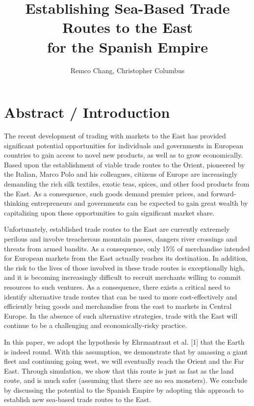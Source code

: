 \documentclass{proc}
\begin{document}
\title{Establishing Sea-Based Trade Routes to the East\\for the Spanish Empire}

\author{Remco Chang, Christopher Columbus}

\maketitle

\section{Abstract / Introduction}

The recent development of trading with markets to the East has provided significant potential opportunities for individuals and governments in European countries to gain access to novel new products, as well as to grow economically.
Based upon the establishment of viable trade routes to the Orient, pioneered by the Italian, Marco Polo and his colleagues, citizens of Europe are increasingly demanding the rich silk textiles, exotic teas, spices, and other food products from the East.
As a consequence, such goods demand premier prices, and forward-thinking entrepreneurs and governments can be expected to gain great wealth by capitalizing upon these opportunities to gain significant market share.

Unfortunately, established trade routes to the East are currently extremely perilous and involve treacherous mountain passes, dangers river crossings and threats from armed bandits.
As a consequence, only 15\% of merchandise intended for European markets from the East actually reaches its destination.
In addition, the risk to the lives of those involved in these trade routes is exceptionally high, and it is becoming increasingly difficult to recruit merchants willing to commit resources to such ventures.
As a consequence, there exists a critical need to identify alternative trade routes that can be used to more cost-effectively and efficiently bring goods and merchandise from the east to markets in Central Europe. 
In the absence of such alternative strategies, trade with the East will continue to be a challenging and economically-risky practice. 

In this paper, we adopt the hypothesis by Ehrmantraut et al. [1] that the Earth is indeed round. 
With this assumption, we demonstrate that by amassing a giant fleet and continuing going west, we will eventually reach the Orient and the Far East.
Through simulation, we show that this route is just as fast as the land route, and is much safer (assuming that there are no sea monsters).
We conclude by discussing the potential to the Spanish Empire by adopting this approach to establish new sea-based trade routes to the East.
\end{document}
